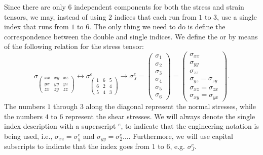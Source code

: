 Since there are only $6$ independent components for both the stress and strain tensors, we may, instead of using $2$ indices that each run from $1$ to $3$, use a single index that runs from $1$ to $6$.  The only thing we need to do is define the correspondence between the double and single indices.  We define the  or  by means of the following relation for the stress tensor:
\begin{equation}
	\sigma_{\left(\begin{matrix}
	xx  &  xy  &  xz \\
	yx  &  yy  &  yz \\
	zx  &  zy  &  zz \end{matrix}\right)}
	\leftrightarrow
	\sigma^e_{\left(\begin{matrix}
	1  &  6  &  5 \\
	6  &  2  &  4 \\
	5  &  4  &  3 \end{matrix}\right)}\rightarrow \sigma^e_J = \left(\begin{matrix}
	\sigma_{1}\\ \sigma_{2}\\ \sigma_{3}\\ \sigma_{4}\\ \sigma_{5}\\ \sigma_{6}\end{matrix}\right) 
	= \left(\begin{matrix}
	\sigma_{xx}\\ \sigma_{yy}\\ \sigma_{zz}\\ \sigma_{yz}=\sigma_{zy}\\ \sigma_{xz}=\sigma_{zx}\\ \sigma_{xy}=\sigma_{yx}\end{matrix}\right). 
\end{equation}	
The numbers $1$ through $3$ along the diagonal represent the normal stresses, while the numbers $4$ to $6$ represent the shear stresses.  We will always denote the single index description with a superscript $^e$, to indicate that the engineering notation is being used, i.e., $\sigma_{xz} = \sigma^e_5$ and $\sigma_{yy} = \sigma^e_2\ldots$. Furthermore, we will use capital subscripts to indicate that the index goes from $1$ to $6$, e.g. $\sigma^e_J$.

